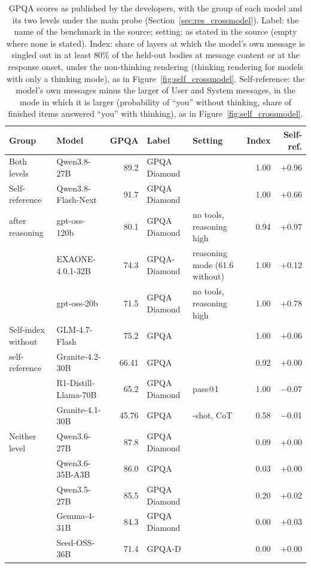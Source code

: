 \begin{table}[htbp]
\centering
\caption{GPQA scores as published by the developers, with the group of each model and its two levels under the main probe (Section~\ref{sec:res_crossmodel}). Label: the name of the benchmark in the source; setting: as stated in the source (empty where none is stated). Index: share of layers at which the model's own message is singled out in at least 80\% of the held-out bodies at message content or at the response onset, under the non-thinking rendering (thinking rendering for models with only a thinking mode), as in Figure~\ref{fig:self_crossmodel}. Self-reference: the model's own messages minus the larger of User and System messages, in the mode in which it is larger (probability of ``you'' without thinking, share of finished items answered ``you'' with thinking), as in Figure~\ref{fig:self_crossmodel}.}
\label{tab:self_benchmarks}
{\footnotesize
\setlength{\tabcolsep}{3.5pt}
\begin{tabular}{llrl>{\raggedright\arraybackslash}p{2.7cm}rr}
\toprule
Group & Model & GPQA & Label & Setting & Index & Self-ref. \\
\midrule
Both levels & Qwen3.8-27B & 89.2 & GPQA Diamond &  & 1.00 & +0.96 \\
\midrule
Self-reference & Qwen3.8-Flash-Next & 91.7 & GPQA Diamond &  & 1.00 & +0.66 \\
after reasoning & gpt-oss-120b & 80.1 & GPQA Diamond & no tools, reasoning high & 0.94 & +0.97 \\
 & EXAONE-4.0.1-32B & 74.3 & GPQA-Diamond & reasoning mode (61.6 without) & 1.00 & +0.12 \\
 & gpt-oss-20b & 71.5 & GPQA Diamond & no tools, reasoning high & 1.00 & +0.78 \\
\midrule
Self-index without & GLM-4.7-Flash & 75.2 & GPQA &  & 1.00 & +0.06 \\
self-reference & Granite-4.2-30B & 66.41 & GPQA &  & 0.92 & +0.00 \\
 & R1-Distill-Llama-70B & 65.2 & GPQA Diamond & pass@1 & 1.00 & $-$0.07 \\
 & Granite-4.1-30B & 45.76 & GPQA & 0-shot, CoT & 0.58 & $-$0.01 \\
\midrule
Neither level & Qwen3.6-27B & 87.8 & GPQA Diamond &  & 0.09 & +0.00 \\
 & Qwen3.6-35B-A3B & 86.0 & GPQA &  & 0.03 & +0.00 \\
 & Qwen3.5-27B & 85.5 & GPQA Diamond &  & 0.20 & +0.02 \\
 & Gemma-4-31B & 84.3 & GPQA Diamond &  & 0.00 & +0.03 \\
 & Seed-OSS-36B & 71.4 & GPQA-D &  & 0.00 & +0.00 \\
\bottomrule
\end{tabular}}


\end{table}
